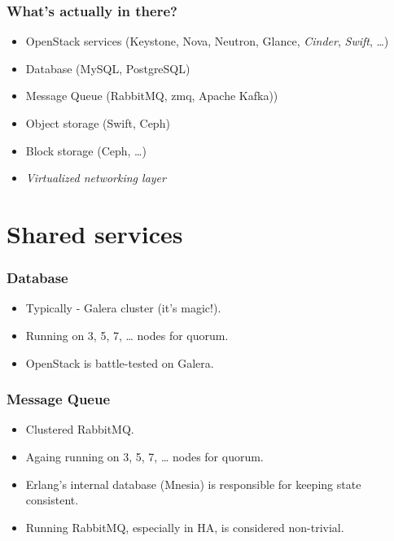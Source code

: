 \documentclass[aspectratio=43]{beamer}
\begin{document}
\begin{frame}
    \frametitle{What's actually in there?}
    \begin{center}
        \begin{itemize}
            \pause
            \item OpenStack services (Keystone, Nova, Neutron, Glance, \emph{Cinder}, \emph{Swift}, …)
            \pause
            \item Database (MySQL, PostgreSQL)
            \pause
            \item Message Queue (RabbitMQ, zmq, Apache Kafka))
            \pause
            \item Object storage (Swift, Ceph)
            \pause
            \item Block storage (Ceph, …)
            \pause
            \item \emph{Virtualized networking layer}
        \end{itemize}
    \end{center}
\end{frame}

\section{Shared services}

\begin{frame}
    \frametitle{Database}
    \begin{center}
        \begin{itemize}
            \item Typically - Galera cluster (it's magic!).
            \item Running on 3, 5, 7, … nodes for quorum.
            \item OpenStack is battle-tested on Galera.
        \end{itemize}
    \end{center}
\end{frame}

\begin{frame}
    \frametitle{Message Queue}
    \begin{center}
        \begin{itemize}
            \item Clustered RabbitMQ.
            \item Againg running on 3, 5, 7, … nodes for quorum.
            \item Erlang's internal database (Mnesia) is responsible for keeping state consistent.
            \item Running RabbitMQ, especially in HA, is considered non-trivial.
        \end{itemize}
    \end{center}
\end{frame}
\end{document}
